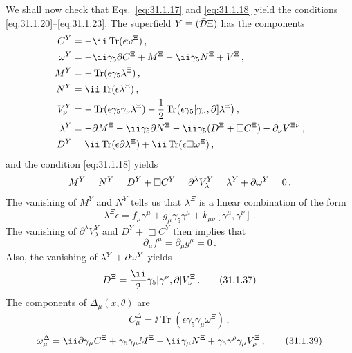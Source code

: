 We shall now check that Eqs.~\eqref{eq:31.1.17} and \eqref{eq:31.1.18} yield
the conditions \eqref{eq:31.1.20}--\eqref{eq:31.1.23}. The superfield
\(Y\equiv(\bar{\mathcal{D}}\Xi)\) has the components
\[
  \begin{aligned}
  C^Y&=-\ii\operatorname{Tr}(\epsilon\omega^\Xi)\,,
  \\
  \omega^Y
  &=-\ii\gamma_5\sl{\partial}C^\Xi
    +M^\Xi-\ii\gamma_5N^\Xi+\sl{V}^\Xi\,,
  \\
  M^Y&=-\operatorname{Tr}(\epsilon\gamma_5\lambda^\Xi)\,,
  \\
  N^Y&=\ii\operatorname{Tr}(\epsilon\lambda^\Xi)\,,
  \\
  V_\nu^Y
  &=-\operatorname{Tr}(\epsilon\gamma_5\gamma_\nu\lambda^\Xi)
    -\frac12\operatorname{Tr}
      \bigl(\epsilon\gamma_5[\gamma_\nu,\sl{\partial}]\lambda^\Xi\bigr)\,,
  \\
  \lambda^Y
  &=-\sl{\partial}M^\Xi-\ii\gamma_5\sl{\partial}N^\Xi
    -\ii\gamma_5(D^\Xi+\Box C^\Xi)-\partial_\nu V^{\Xi\nu}\,,
  \\
  D^Y
  &=\ii\operatorname{Tr}(\epsilon\sl{\partial}\lambda^\Xi)
    +\ii\operatorname{Tr}(\epsilon\Box\omega^\Xi)\,,
  \end{aligned}
\]
and the condition \eqref{eq:31.1.18} yields
\[
  M^Y=N^Y=D^Y+\Box C^Y
  =\partial^\lambda V_\lambda^Y
  =\lambda^Y+\sl{\partial}\omega^Y=0\,.
\]
The vanishing of \(M^Y\) and \(N^Y\) tells us that \(\lambda^\Xi\) is a
linear combination of the form
\begin{equation}
  \lambda^\Xi\epsilon
  =f_\mu\gamma^\mu+g_\mu\gamma_5\gamma^\mu
   +k_{\mu\nu}[\gamma^\mu,\gamma^\nu]\,.
  \tag{31.1.35}\label{eq:31.1.35}
\end{equation}
The vanishing of \(\partial^\lambda V_\lambda^Y\) and
\(D^Y+\Box C^Y\) then implies that
\begin{equation}
  \partial_\mu f^\mu=\partial_\mu g^\mu=0\,.
  \tag{31.1.36}\label{eq:31.1.36}
\end{equation}
Also, the vanishing of \(\lambda^Y+\sl{\partial}\omega^Y\) yields
\begin{equation}
  D^\Xi
  =\frac{\ii}{2}\gamma_5[\gamma^\nu,\sl{\partial}]V_\nu^\Xi\,.
  \tag{31.1.37}\label{eq:31.1.37}
\end{equation}
The components of \(\Delta_\mu(x,\theta)\) are
\begin{equation}
  C_\mu^\Delta
  =\ii\operatorname{Tr}(\epsilon\gamma_5\gamma_\mu\omega^\Xi)\,,
  \tag{31.1.38}\label{eq:31.1.38}
\end{equation}
\begin{equation}
  \omega_\mu^\Delta
  =\ii\sl{\partial}\gamma_\mu C^\Xi
   +\gamma_5\gamma_\mu M^\Xi-\ii\gamma_\mu N^\Xi
   +\gamma_5\gamma^\rho\gamma_\mu V_\rho^\Xi\,,
  \tag{31.1.39}\label{eq:31.1.39}
\end{equation}

